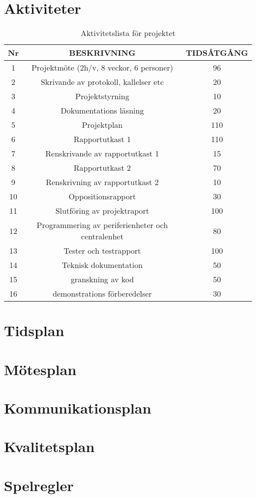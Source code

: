\documentclass{article}
\begin{document}
\section{Aktiviteter}
\begin{table}
    \centering
    \begin{tabular}{|c|c|c|}
    \hline
       Nr  & BESKRIVNING & TIDSÅTGÅNG\\
       \hline
       1   & Projektmöte (2h/v, 8 veckor, 6 personer) & 96\\
       \hline
       2   & Skrivande av protokoll, kallelser etc & 20\\
       \hline
       3   & Projektstyrning & 10\\
       \hline
       4   & Dokumentations läsning & 20\\
       \hline
       5   & Projektplan & 110\\
       \hline
       6   & Rapportutkast 1 & 110\\
       \hline
       7   & Renskrivande av rapportutkast 1 & 15\\
       \hline
       8   & Rapportutkast 2 & 70 \\
       \hline
       9   & Renskrivning av rapportutkast 2 & 10\\
       \hline
       10  & Oppositionsrapport & 30\\
       \hline
       11  & Slutföring av projektraport & 100\\
       \hline
       12  & Programmering av periferienheter och centralenhet & 80\\
       \hline
       13 & Tester och testrapport & 100\\
       \hline
       14 & Teknisk dokumentation & 50\\
       \hline
       15 & granskning av kod & 50\\
       \hline
       16 & demonstrations förberedelser & 30\\
       \hline
    \end{tabular}
    \caption{Aktivitetslista för projektet}
    \label{tab:my_label}
\end{table}

\section{Tidsplan}

\section{Mötesplan}

\section{Kommunikationsplan}

\section{Kvalitetsplan}

\section{Spelregler}
\end{document}
